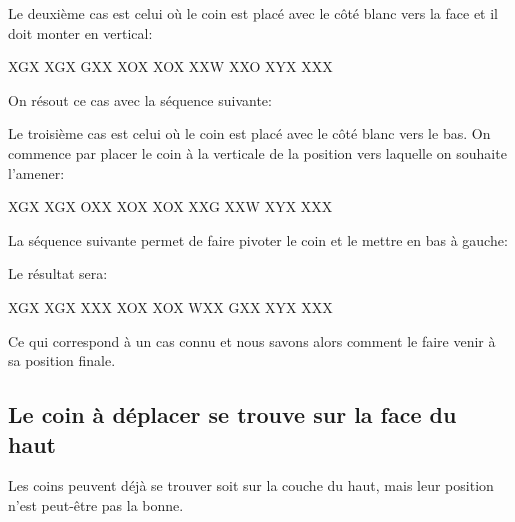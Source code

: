 Le deuxième cas est celui où le coin est placé avec le côté blanc vers
la face et il doit monter en vertical: 

\begin{center}
	\RubikFaceRight%
	{X}{G}{X}%
	{X}{G}{X}%
	{G}{X}{X}
	\RubikFaceFront%
	{X}{O}{X}%
	{X}{O}{X}%
	{X}{X}{W}
	\RubikFaceDown%
	{X}{X}{O}%
	{X}{Y}{X}%
	{X}{X}{X}
	
\end{center} 

On résout ce cas avec la séquence suivante:


Le troisième cas est celui où le coin est placé avec le côté blanc vers
le bas. On commence par placer le coin à la verticale de la position
vers laquelle on souhaite l'amener:

\begin{center}
	\RubikFaceRight%
	{X}{G}{X}%
	{X}{G}{X}%
	{O}{X}{X}
	\RubikFaceFront%
	{X}{O}{X}%
	{X}{O}{X}%
	{X}{X}{G}
	\RubikFaceDown%
	{X}{X}{W}%
	{X}{Y}{X}%
	{X}{X}{X}
	
\end{center} 

La séquence suivante permet de faire pivoter le coin et le mettre en bas à gauche: 

\begin{samepage}
Le résultat sera:

\begin{center}
	\RubikFaceRight%
	{X}{G}{X}%
	{X}{G}{X}%
	{X}{X}{X}
	\RubikFaceFront%
	{X}{O}{X}%
	{X}{O}{X}%
	{W}{X}{X}
	\RubikFaceDown%
	{G}{X}{X}%
	{X}{Y}{X}%
	{X}{X}{X}
	
\end{center} 
\end{samepage}
	
Ce qui correspond à un cas connu et nous savons alors comment le faire
venir à sa position finale.

\subsection{Le coin à déplacer se trouve sur la face du haut}

Les coins peuvent déjà se trouver soit sur la couche du haut, mais leur
position n'est peut-être pas la bonne.


